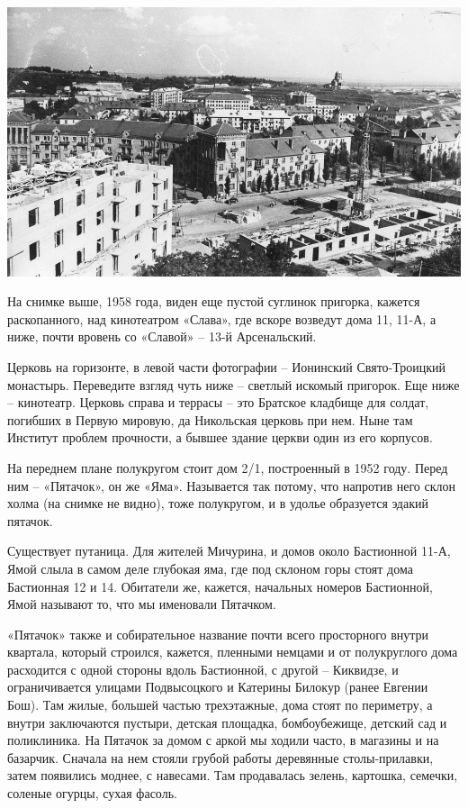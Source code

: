 \begin{center}
\includegraphics[width=\linewidth]{chast-vosp/zver/0932_KK.jpg}
\end{center}

На снимке выше, 1958 года, виден еще пустой суглинок пригорка, кажется раскопанного, над кинотеатром «Слава», где вскоре возведут дома 11, 11-А, а ниже, почти вровень со «Славой» – 13-й Арсенальский.

Церковь на горизонте, в левой части фотографии – Ионинский Свято-Троицкий монастырь. Переведите взгляд чуть ниже – светлый искомый пригорок. Еще ниже – кинотеатр. Церковь справа и террасы – это Братское кладбище для солдат, погибших в Первую мировую, да Никольская церковь при нем. Ныне там Институт проблем прочности, а бывшее здание церкви один из его корпусов.

На переднем плане полукругом стоит дом 2/1, построенный в 1952 году. Перед ним – «Пятачок», он же «Яма». Называется так потому, что напротив него склон холма (на снимке не видно), тоже полукругом, и в удолье образуется эдакий пятачок.

Существует путаница. Для жителей Мичурина, и домов около Бастионной 11-А, Ямой слыла в самом деле глубокая яма, где под склоном горы стоят дома Бастионная 12 и 14. Обитатели же, кажется, начальных номеров Бастионной, Ямой называют то, что мы именовали Пятачком.

«Пятачок» также и собирательное название почти всего просторного внутри квартала, который строился, кажется, пленными немцами и от полукруглого дома расходится с одной стороны вдоль Бастионной, с другой – Киквидзе, и ограничивается улицами Подвысоцкого и Катерины Билокур (ранее Евгении Бош). Там жилые, большей частью трехэтажные, дома стоят по периметру, а внутри заключаются пустыри, детская площадка, бомбоубежище, детский сад и поликлиника. На Пятачок за домом с аркой мы ходили часто, в магазины и на базарчик. Сначала на нем стояли грубой работы деревянные столы-прилавки, затем появились моднее, с навесами. Там продавалась зелень, картошка, семечки, соленые огурцы, сухая фасоль.

